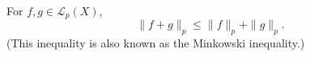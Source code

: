 For $f, g \in \mathcal{L}_p(X)$,
$$\| f + g \|_p \leq \| f \|_p + \| g \|_p.$$
(This inequality is also known as the Minkowski inequality.)
